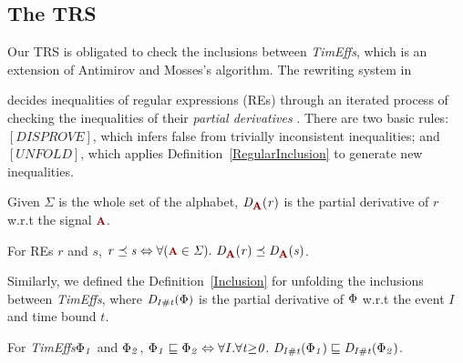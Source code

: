 \documentclass[acmsmall,10pt,review]{acmart}
\newcommand{\timedEffects}{\emph{TimEffs}}
\newcommand{\effect}{\textcolor{black}{\ensuremath{\mathrm{\Phi}}}}
\newcommand{\anyevent}[1]{{\textcolor{darkred}
{{\textbf{\footnotesize #1}}}}}
\newcommand{\code}[1]{{\tt{\ensuremath{\m{#1}}}}}
\newcommand{\CONTAIN}{\sqsubseteq}
\newcommand{\m}{\mathit}
\newcommand\tabref[1]{Table \textcolor{black}{\ref{#1}}.}
\newcommand\defref[1]{Definition~\textcolor{blue}{\ref{#1}}}
\begin{document}
\subsection{The TRS}
Our TRS is obligated to check the inclusions between \timedEffects, which is an extension of Antimirov and Mosses's algorithm. The rewriting system in {\cite{antimirov1995rewriting}  
decides inequalities of regular expressions (REs) through an iterated process of checking the inequalities of their \emph{partial derivatives} \cite{antimirov1995partial}. There are two basic rules: 
\code{[DISPROVE]}, which infers false from trivially inconsistent inequalities; and  
\code{[UNFOLD]}, which applies \defref{RegularInclusion} to generate new inequalities.

Given \code{\Sigma} is the whole set of the alphabet, 
\code{D_{\anyevent{A}}(r)} is the partial derivative of \code{r} w.r.t the signal \code{\anyevent{A}}. 

\begin{definition}\label{RegularInclusion}  For REs \code{r} and \code{s}, \code{r \preceq s \Leftrightarrow \forall (\anyevent{A} \in \Sigma).\ D_{\anyevent{A}}(r) \preceq D_{\anyevent{A}}(s)}.
\end{definition}

Similarly, we defined the \defref{Inclusion} for unfolding the inclusions  between \timedEffects, where \code{D_{I\# t}(\effect)} is the partial derivative of \code{\effect} w.r.t the event \code{I} and time bound \code{t}. 

\begin{definition}[\timedEffects Inclusion]\label{Inclusion}  %
For \timedEffects \code{\effect_1 } and \code{\effect_2}, 
\code{\effect_1  \CONTAIN \effect_2 \Leftrightarrow \forall I. \forall t {\geq} 0.\ D_{I\# t}(\effect_1)  \CONTAIN D_{I\# t}(\effect_2)}.
\end{definition}






}
\end{document}
